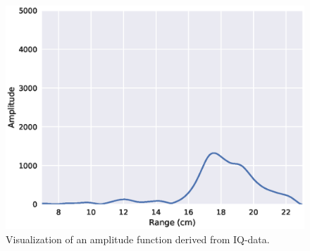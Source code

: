 

\begin{figure}[h]
	\centering
	\includegraphics[scale=0.7]{figs_temp/single_sweep_iq}
	\caption{Visualization of an amplitude function derived from IQ-data.}
	\label{fig:single_sweep_iq}
\end{figure}












%
%

